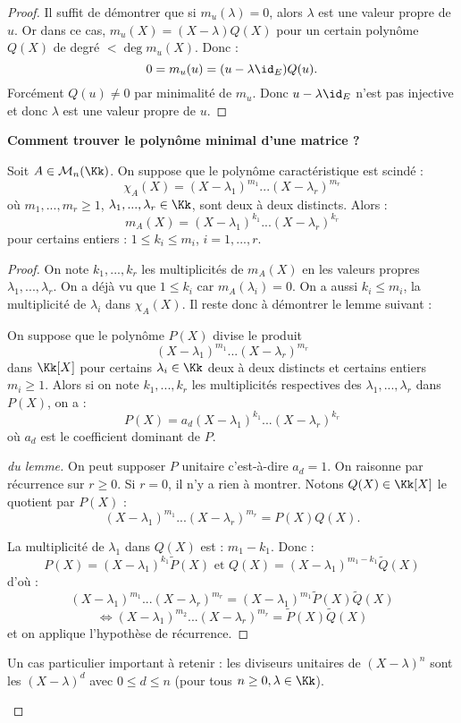 \documentclass[class=report,crop=false]{standalone}
\begin{document}
\begin{proof}
Il suffit de démontrer que si $m_u(\lambda) = 0$, alors $\lambda$ est une valeur propre de $u$. Or dans ce cas, $m_u(X) = (X-\lambda)Q(X)$ pour un certain polynôme $Q(X)$ de degré $< \deg m_u(X)$. Donc :
\[0 =m_u(u) = (u-\lambda\id_E)Q(u) .\]
Forcément $Q(u) \neq 0$ par minimalité de $m_u$. Donc $u-\lambda\id_E$ n'est pas injective et donc $\lambda $ est une valeur propre de $u$.
\end{proof}

{\bf Comment trouver le polynôme minimal d'une matrice ?}

\begin{theoreme}
Soit $A \in \mathcal{M}_n(\Kk)$. On suppose que le polynôme caractéristique est scindé :
\[\chi_A(X) = (X-\lambda_1)^{m_1}...(X-\lambda_r)^{m_r}\]
où $m_1,...,m_r \ge 1$, $\lambda_1,...,\lambda_r \in \Kk$, sont deux à deux distincts. Alors :
\[m_A(X) = (X-\lambda_1)^{k_1}...(X-\lambda_r)^{k_r}\]
pour certains entiers : $1 \le k_i\le m_i$, $i=1,...,r$. 
\end{theoreme}

\begin{proof}
On note $k_1,...,k_r$ les multiplicités de $m_A(X)$ en les valeurs propres $\lambda_1,...,\lambda_r$. On a déjà vu que $1 \le k_i$ car $m_A(\lambda_i)=0$. On a aussi $k_i \le m_i$, la multiplicité de $\lambda_i$ dans $\chi_A(X)$. Il reste donc à démontrer le lemme suivant :
\begin{lemme}\label{lem:div}
On suppose que le polynôme $P(X)$ divise le produit 
\[(X-\lambda_1)^{m_1}...(X-\lambda_r)^{m_r}\]
dans $\Kk[X]$ pour certains $\lambda_i \in \Kk$ deux à deux distincts et certains entiers $m_i \ge 1$. Alors si on note $k_1,...,k_r$ les multiplicités respectives des $\lambda_1,...,\lambda_r$ dans $P(X)$, on a :
\[P(X) = a_d(X-\lambda_1)^{k_1}...(X-\lambda_r)^{k_r}\]
où $a_d$ est le coefficient dominant de $P$.
\end{lemme}
 \begin{proof}[du lemme]
On peut supposer $P$ unitaire c'est-à-dire $a_d =1$. On raisonne par récurrence sur $r \ge 0$. Si $r=0$, il n'y a rien à montrer. Notons  $Q(X) \in \Kk[X]$ le quotient par $P(X)$ : 
\[(X-\lambda_1)^{m_1}...(X-\lambda_r)^{m_r} = P(X) Q(X) .\]

La multiplicité de $\lambda_1$ dans $Q(X)$ est : $m_1-k_1$. Donc :
\[P(X) = (X-\lambda_1)^{k_1}\tilde{P}(X) \text{ et } Q(X) = (X-\lambda_1)^{m_1-k_1}\tilde{Q}(X)\]
d'où : 
\[(X-\lambda_1)^{m_1}...(X-\lambda_r)^{m_r} = (X-\lambda_1)^{m_1}\tilde{P}(X)\tilde{Q}(X)\]
\[\iff (X-\lambda_1)^{m_2}...(X-\lambda_r)^{m_r} = \tilde{P}(X)\tilde{Q}(X) \]
et on applique l'hypothèse de récurrence.

\end{proof}
\begin{remarque*}
Un cas particulier important à retenir :
les diviseurs unitaires de $(X-\lambda)^n$ sont les $(X-\lambda)^d$ avec $0\le d \le n$ (pour tous $n \ge 0, \lambda \in \Kk$).
\end{remarque*}

\end{proof}
\end{document}
